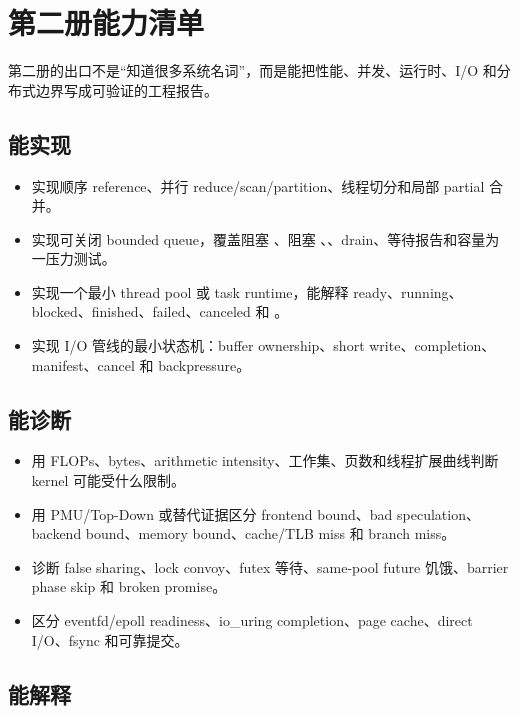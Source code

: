 \chapter*{第二册能力清单}

第二册的出口不是“知道很多系统名词”，而是能把性能、并发、运行时、I/O 和分布式边界写成可验证的工程报告。

\section*{能实现}

\begin{itemize}
  \item 实现顺序 reference、并行 reduce/scan/partition、线程切分和局部 partial 合并。
  \item 实现可关闭 bounded queue，覆盖阻塞 、阻塞 、、drain、等待报告和容量为一压力测试。
  \item 实现一个最小 thread pool 或 task runtime，能解释 ready、running、blocked、finished、failed、canceled 和 。
  \item 实现 I/O 管线的最小状态机：buffer ownership、short write、completion、manifest、cancel 和 backpressure。
\end{itemize}

\section*{能诊断}

\begin{itemize}
  \item 用 FLOPs、bytes、arithmetic intensity、工作集、页数和线程扩展曲线判断 kernel 可能受什么限制。
  \item 用 PMU/Top-Down 或替代证据区分 frontend bound、bad speculation、backend bound、memory bound、cache/TLB miss 和 branch miss。
  \item 诊断 false sharing、lock convoy、futex 等待、same-pool future 饥饿、barrier phase skip 和 broken promise。
  \item 区分 eventfd/epoll readiness、io\_uring completion、page cache、direct I/O、fsync 和可靠提交。
\end{itemize}

\section*{能解释}

